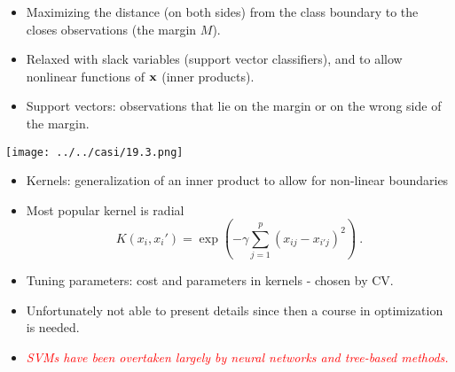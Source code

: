 \documentclass[10pt,ignorenonframetext,]{beamer}
\providecommand{\tightlist}{%
  \setlength{\itemsep}{0pt}\setlength{\parskip}{0pt}}
\begin{document}
\begin{frame}

\begin{itemize}
\item
  Maximizing the distance (on both sides) from the class boundary to the
  closes observations (the margin \(M\)).
\item
  Relaxed with slack variables (support vector classifiers), and to
  allow nonlinear functions of \({\bf x}\) (inner products).
\end{itemize}

\vspace{2mm}

\begin{itemize}
\tightlist
\item
  Support vectors: observations that lie on the margin or on the wrong
  side of the margin.
\end{itemize}

\centering

\texttt{[image: ../../casi/19.3.png]}

\end{frame}

\begin{frame}

\begin{itemize}
\item
  Kernels: generalization of an inner product to allow for non-linear
  boundaries
\item
  Most popular kernel is radial
  \[K(x_i,x_i')=\exp(-\gamma\sum_{j=1}^p (x_{ij}-x_{i'j})^2) \ . \]
\item
  Tuning parameters: cost and parameters in kernels - chosen by CV.
\end{itemize}

\vspace{2mm}

\begin{itemize}
\tightlist
\item
  Unfortunately not able to present details since then a course in
  optimization is needed.
\end{itemize}

\vspace{2mm}

\begin{itemize}
\tightlist
\item
  \emph{\textcolor{red}{SVMs have been overtaken largely by neural networks and tree-based methods.}}
\end{itemize}

\end{frame}
\end{document}
